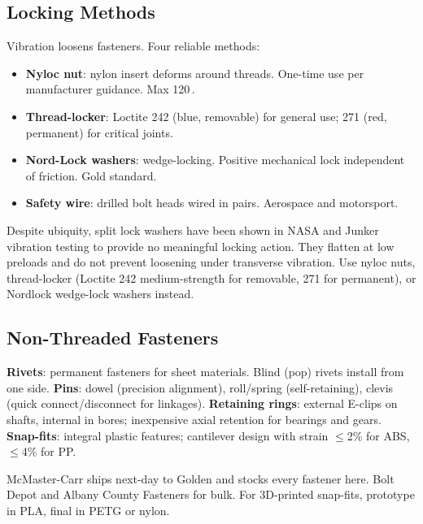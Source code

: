 \subsection{Locking Methods}
Vibration loosens fasteners. Four reliable methods:
\begin{itemize}[nosep,leftmargin=1.5em]
\item \textbf{Nyloc nut}: nylon insert deforms around threads. One-time use per manufacturer guidance. Max 120\,\degC{}.
\item \textbf{Thread-locker}: Loctite 242 (blue, removable) for general use; 271 (red, permanent) for critical joints.
\item \textbf{Nord-Lock washers}: wedge-locking. Positive mechanical lock independent of friction. Gold standard.
\item \textbf{Safety wire}: drilled bolt heads wired in pairs. Aerospace and motorsport.
\end{itemize}

\begin{warningbox}
Despite ubiquity, split lock washers have been shown in NASA and Junker vibration testing to provide no meaningful locking action. They flatten at low preloads and do not prevent loosening under transverse vibration. Use nyloc nuts, thread-locker (Loctite 242 medium-strength for removable, 271 for permanent), or Nordlock wedge-lock washers instead.
\end{warningbox}

\subsection{Non-Threaded Fasteners}
\textbf{Rivets}: permanent fasteners for sheet materials. Blind (pop) rivets install from one side. \textbf{Pins}: dowel (precision alignment), roll/spring (self-retaining), clevis (quick connect/disconnect for linkages). \textbf{Retaining rings}: external E-clips on shafts, internal in bores; inexpensive axial retention for bearings and gears. \textbf{Snap-fits}: integral plastic features; cantilever design with strain $\leq$2\% for ABS, $\leq$4\% for PP.

\begin{tipbox}
McMaster-Carr ships next-day to Golden and stocks every fastener here. Bolt Depot and Albany County Fasteners for bulk. For 3D-printed snap-fits, prototype in PLA, final in PETG or nylon.
\end{tipbox}

